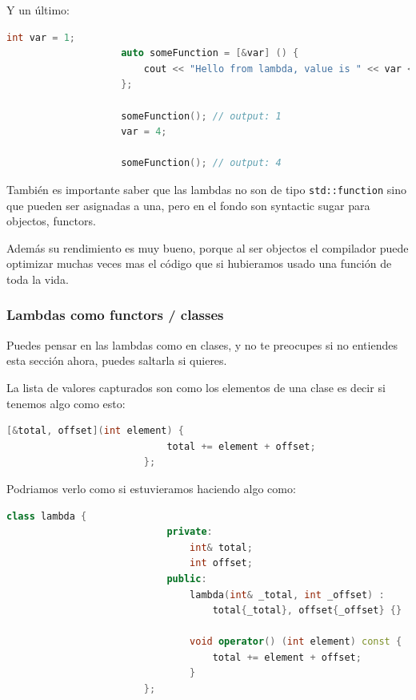 \documentclass[12pt, fleqn]{report}                             %
\theoremstyle{break}                                            %
\newcommand{\textCode}[1]  { \texttt{#1} }                      %
\begin{document}
                Y un último:
                \begin{lstlisting}[language=C++, gobble=20]
                    int var = 1;
                    auto someFunction = [&var] () { 
                        cout << "Hello from lambda, value is " << var << endl;
                    };

                    someFunction(); // output: 1
                    var = 4;

                    someFunction(); // output: 4
                \end{lstlisting}

                También es importante saber que las lambdas no son de tipo \textCode{std::function}
                sino que pueden ser asignadas a una, pero en el fondo son syntactic sugar para objectos,
                functors.

                Además su rendimiento es muy bueno, porque al ser objectos el compilador puede optimizar
                muchas veces mas el código que si hubieramos usado una función de toda la vida.


                \subsubsection{Lambdas como functors / classes}
                
                    Puedes pensar en las lambdas como en clases, y no te preocupes si no entiendes
                    esta sección ahora, puedes saltarla si quieres.

                    La lista de valores capturados son como los elementos de una clase
                    es decir si tenemos algo como esto:

                    \begin{lstlisting}[language=C++, gobble=24]
                        [&total, offset](int element) { 
                            total += element + offset;
                        };
                    \end{lstlisting}

                    Podriamos verlo como si estuvieramos haciendo algo como:
                    \begin{lstlisting}[language=C++, gobble=24]
                        class lambda {
                            private:
                                int& total;
                                int offset;
                            public: 
                                lambda(int& _total, int _offset) : 
                                    total{_total}, offset{_offset} {}

                                void operator() (int element) const { 
                                    total += element + offset;
                                }
                        };
                    \end{lstlisting}
\end{document}
